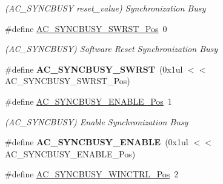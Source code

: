 \begin{DoxyCompactItemize}
\begin{DoxyCompactList}\small\item\em (A\+C\+\_\+\+S\+Y\+N\+C\+B\+U\+S\+Y reset\+\_\+value) Synchronization Busy \end{DoxyCompactList}\item 
\hypertarget{group___s_a_m_l21___a_c_ga115ebb8e897e6d11abcba20bd23e73f4}{}\#define \hyperlink{group___s_a_m_l21___a_c_ga115ebb8e897e6d11abcba20bd23e73f4}{A\+C\+\_\+\+S\+Y\+N\+C\+B\+U\+S\+Y\+\_\+\+S\+W\+R\+S\+T\+\_\+\+Pos}~0\label{group___s_a_m_l21___a_c_ga115ebb8e897e6d11abcba20bd23e73f4}

\begin{DoxyCompactList}\small\item\em (A\+C\+\_\+\+S\+Y\+N\+C\+B\+U\+S\+Y) Software Reset Synchronization Busy \end{DoxyCompactList}\item 
\hypertarget{group___s_a_m_l21___a_c_ga3fe595d6b645e6144f65606ad25d8365}{}\#define {\bfseries A\+C\+\_\+\+S\+Y\+N\+C\+B\+U\+S\+Y\+\_\+\+S\+W\+R\+S\+T}~(0x1ul $<$$<$ A\+C\+\_\+\+S\+Y\+N\+C\+B\+U\+S\+Y\+\_\+\+S\+W\+R\+S\+T\+\_\+\+Pos)\label{group___s_a_m_l21___a_c_ga3fe595d6b645e6144f65606ad25d8365}

\item 
\hypertarget{group___s_a_m_l21___a_c_gaf1545b69ee527353f1cf98de43c70ce0}{}\#define \hyperlink{group___s_a_m_l21___a_c_gaf1545b69ee527353f1cf98de43c70ce0}{A\+C\+\_\+\+S\+Y\+N\+C\+B\+U\+S\+Y\+\_\+\+E\+N\+A\+B\+L\+E\+\_\+\+Pos}~1\label{group___s_a_m_l21___a_c_gaf1545b69ee527353f1cf98de43c70ce0}

\begin{DoxyCompactList}\small\item\em (A\+C\+\_\+\+S\+Y\+N\+C\+B\+U\+S\+Y) Enable Synchronization Busy \end{DoxyCompactList}\item 
\hypertarget{group___s_a_m_l21___a_c_ga74bb9b7c93cc3c6e589803d561169d83}{}\#define {\bfseries A\+C\+\_\+\+S\+Y\+N\+C\+B\+U\+S\+Y\+\_\+\+E\+N\+A\+B\+L\+E}~(0x1ul $<$$<$ A\+C\+\_\+\+S\+Y\+N\+C\+B\+U\+S\+Y\+\_\+\+E\+N\+A\+B\+L\+E\+\_\+\+Pos)\label{group___s_a_m_l21___a_c_ga74bb9b7c93cc3c6e589803d561169d83}

\item 
\hypertarget{group___s_a_m_l21___a_c_ga60c112d3aebed9fcf80f298bdadb6ff0}{}\#define \hyperlink{group___s_a_m_l21___a_c_ga60c112d3aebed9fcf80f298bdadb6ff0}{A\+C\+\_\+\+S\+Y\+N\+C\+B\+U\+S\+Y\+\_\+\+W\+I\+N\+C\+T\+R\+L\+\_\+\+Pos}~2\label{group___s_a_m_l21___a_c_ga60c112d3aebed9fcf80f298bdadb6ff0}


\end{DoxyCompactItemize}

